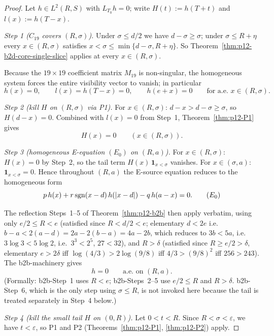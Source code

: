 \begin{proof}
Let $h \in L^{2}(R, S)$ with $L_{T_0} h = 0$; write $H(t) := h(T+t)$
and $l(x) := h(T - x)$.

\smallskip
\noindent\emph{Step 1 ($C_{19}$ covers $(R, \sigma)$).}
Under $\sigma \le d/2$ we have $d - \sigma \ge \sigma$; under
$\sigma \le R + \eta$ every $x \in (R, \sigma)$ satisfies
$x < \sigma \le \min\{d - \sigma, R + \eta\}$.  So
Theorem~\ref{thm:p12-b2d-core-single-slice} applies at every
$x \in (R, \sigma)$.

Because the $19 \times 19$ coefficient matrix $M_{19}$ is
non-singular, the homogeneous system forces the entire visibility
vector to vanish; in particular
\[
h(x) = 0,
\qquad l(x) = h(T - x) = 0,
\qquad h(e + x) = 0
\qquad\text{for a.e.\ } x \in (R, \sigma).
\]

\smallskip
\noindent\emph{Step 2 (kill $H$ on $(R, \sigma)$ via P1).}
For $x \in (R, \sigma)$: $d - x > d - \sigma \ge \sigma$, so
$H(d - x) = 0$.  Combined with $l(x) = 0$ from Step~1,
Theorem~\ref{thm:p12-P1} gives
\[
H(x) = 0
\qquad(x \in (R, \sigma)).
\]

\smallskip
\noindent\emph{Step 3 (homogeneous E-equation $(E_0)$ on $(R, a)$).}
For $x \in (R, \sigma)$: $H(x) = 0$ by Step~2, so the tail term
$H(x)\, \mathbf 1_{x < \sigma}$ vanishes.  For
$x \in (\sigma, a)$: $\mathbf 1_{x < \sigma} = 0$.  Hence
throughout $(R, a)$ the E-source equation reduces to the
homogeneous form
\[
p\, h(x) + r\, \mathrm{sgn}(x - d)\, h(|x - d|) - q\, h(a - x) = 0.
\tag{$E_{0}$}
\]

The reflection Steps~1--5 of Theorem~\ref{thm:p12-b2b} then apply
verbatim, using only
$e/2 \le R < e$ (satisfied since $R < d/2 < e$; elementary
$d < 2e$ i.e.\ $b - a < 2(a - d) = 2a - 2(b - a) = 4a - 2b$,
which reduces to $3b < 5a$, i.e.\ $3\log 3 < 5\log 2$,
i.e.\ $3^{3} < 2^{5}$, $27 < 32$),
and $R > \delta$ (satisfied since $R \ge e/2 > \delta$, elementary
$e > 2\delta$ iff $\log(4/3) > 2 \log(9/8)$ iff
$4/3 > (9/8)^{2}$ iff $256 > 243$).
The b2b-machinery gives
\[
h = 0
\qquad\text{a.e.\ on } (R, a).
\]
(Formally: b2b-Step~1 uses $R < e$; b2b-Steps~2--5 use $e/2 \le R$
and $R > \delta$.  b2b-Step~6, which is the only step using
$\sigma \le R$, is not invoked here because the tail is treated
separately in Step~4 below.)

\smallskip
\noindent\emph{Step 4 (kill the small tail $H$ on $(0, R)$).}
Let $0 < t < R$.  Since $R < \sigma < \varepsilon$, we have
$t < \varepsilon$, so P1 and P2 (Theorems~\ref{thm:p12-P1},
\ref{thm:p12-P2}) apply.


\end{proof}
